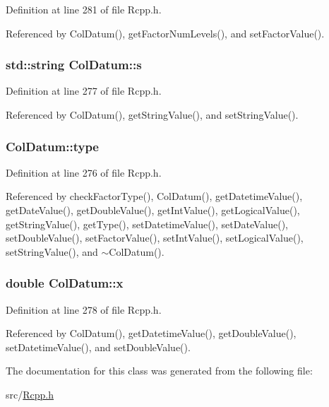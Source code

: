 Definition at line 281 of file Rcpp.h.

Referenced by ColDatum(), getFactorNumLevels(), and setFactorValue().\hypertarget{classColDatum_5a1c85e1da2da02052078a3c8d810be9}{
\subsubsection[{s}]{\setlength{\rightskip}{0pt plus 5cm}std::string {\bf ColDatum::s}}}
\label{classColDatum_5a1c85e1da2da02052078a3c8d810be9}




Definition at line 277 of file Rcpp.h.

Referenced by ColDatum(), getStringValue(), and setStringValue().\hypertarget{classColDatum_c539e7f62828f2683f1825a84a19d231}{
\subsubsection[{type}]{ {\bf ColDatum::type}}}
\label{classColDatum_c539e7f62828f2683f1825a84a19d231}




Definition at line 276 of file Rcpp.h.

Referenced by checkFactorType(), ColDatum(), getDatetimeValue(), getDateValue(), getDoubleValue(), getIntValue(), getLogicalValue(), getStringValue(), getType(), setDatetimeValue(), setDateValue(), setDoubleValue(), setFactorValue(), setIntValue(), setLogicalValue(), setStringValue(), and $\sim$ColDatum().\hypertarget{classColDatum_6d3d286cbd6c4ad24f1f12266662e42e}{
\subsubsection[{x}]{\setlength{\rightskip}{0pt plus 5cm}double {\bf ColDatum::x}}}
\label{classColDatum_6d3d286cbd6c4ad24f1f12266662e42e}




Definition at line 278 of file Rcpp.h.

Referenced by ColDatum(), getDatetimeValue(), getDoubleValue(), setDatetimeValue(), and setDoubleValue().

The documentation for this class was generated from the following file:\begin{CompactItemize}
\item 
src/\hyperlink{Rcpp_8h}{Rcpp.h}\end{CompactItemize}
